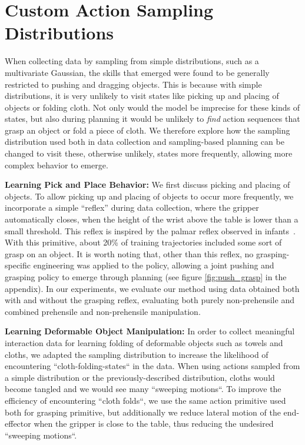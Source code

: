 \section{Custom Action Sampling Distributions}

\label{sec:system}
When collecting data by sampling from simple distributions, such as a multivariate Gaussian, the skills that emerged were found to be generally restricted to pushing and dragging objects. This is because with simple distributions, it is very unlikely to visit states like picking up and placing of objects or folding cloth. Not only would the model be imprecise for these kinds of states, but also during planning it would be unlikely to \emph{find} action sequences that grasp an object or fold a piece of cloth. 
We therefore explore how the sampling distribution used both in data collection and sampling-based planning can be changed to visit these, otherwise unlikely, states more frequently, allowing more complex behavior to emerge. 

\noindent \textbf{Learning Pick and Place Behavior:}
We first discuss picking and placing of objects. To allow picking up and placing of objects to occur more frequently, we incorporate a simple ``reflex'' during data collection, where the gripper automatically closes, when the height of the wrist above the table is lower than a small threshold. This reflex is inspired by the palmar reflex observed in infants~\cite{grasping_fetal}. With this primitive, about 20\% of training trajectories included some sort of grasp on an object. It is worth noting that, other than this reflex, no grasping-specific engineering was applied to the policy, allowing a joint pushing and grasping policy to emerge through planning (see figure \ref{fig:push_grasp} in the appendix). In our experiments, we evaluate our method using data obtained both with and without the grasping reflex, evaluating both purely non-prehensile and combined prehensile and non-prehensile manipulation.

\noindent \textbf{Learning Deformable Object Manipulation:}
In order to collect meaningful interaction data for learning folding of deformable objects such as towels and cloths, we adapted the sampling distribution to increase the likelihood of encountering ``cloth-folding-states`` in the data. When using actions sampled from a simple distribution or the previously-described distribution, cloths would become tangled and we would see many ``sweeping motions``. To improve the efficiency of encountering ``cloth folds``, we use the same action primitive used both for grasping primitive, but additionally we reduce lateral motion of the end-effector when the gripper is close to the table, thus reducing the undesired ``sweeping motions``.

